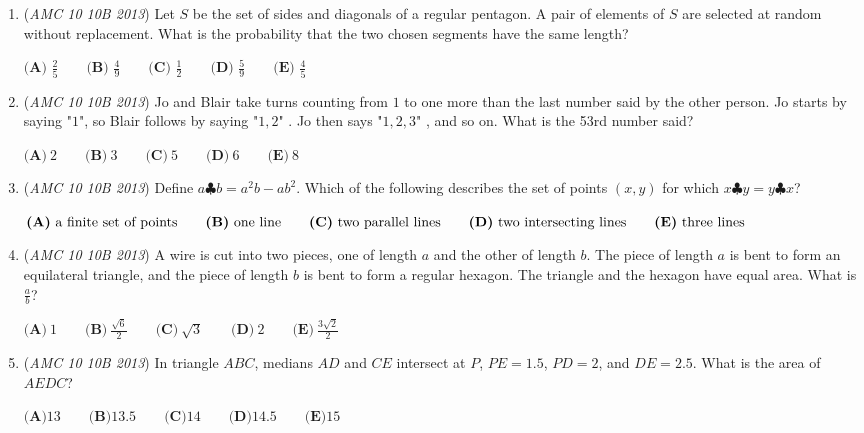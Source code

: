 \begin{enumerate}
	\item (\textit{AMC 10 10B 2013}) Let $S$ be the set of sides and diagonals of a regular pentagon. A pair of elements of $S$ are selected at random without replacement. What is the probability that the two chosen segments have the same length?


 $\textbf{(A) }\frac{2}5\qquad\textbf{(B) }\frac{4}9\qquad\textbf{(C) }\frac{1}2\qquad\textbf{(D) }\frac{5}9\qquad\textbf{(E) }\frac{4}5$


	\item (\textit{AMC 10 10B 2013}) Jo and Blair take turns counting from $1$ to one more than the last number said by the other person. Jo starts by saying "$1$", so Blair follows by saying "$1, 2$" . Jo then says "$1, 2, 3$" , and so on. What is the 53rd number said?


 $\textbf{(A)}\ 2\qquad\textbf{(B)}\ 3\qquad\textbf{(C)}\ 5\qquad\textbf{(D)}\ 6\qquad\textbf{(E)}\ 8$


	\item (\textit{AMC 10 10B 2013}) Define $a\clubsuit b=a^2b-ab^2$. Which of the following describes the set of points $(x, y)$ for which $x\clubsuit y=y\clubsuit x$?


 $\textbf{(A)}\ \text{a finite set of points}\\ \qquad\textbf{(B)}\ \text{one line}\\ \qquad\textbf{(C)}\ \text{two parallel lines}\\ \qquad\textbf{(D)}\ \text{two intersecting lines}\\ \qquad\textbf{(E)}\ \text{three lines}$


	\item (\textit{AMC 10 10B 2013}) A wire is cut into two pieces, one of length $a$ and the other of length $b$. The piece of length $a$ is bent to form an equilateral triangle, and the piece of length $b$ is bent to form a regular hexagon. The triangle and the hexagon have equal area. What is $\frac{a}{b}$?


 $\textbf{(A)}\ 1\qquad\textbf{(B)}\ \frac{\sqrt{6}}{2}\qquad\textbf{(C)}\ \sqrt{3} \qquad\textbf{(D)}\ 2\qquad\textbf{(E)}\ \frac{3\sqrt{2}}{2}$


	\item (\textit{AMC 10 10B 2013}) In triangle $ABC$, medians $AD$ and $CE$ intersect at $P$, $PE=1.5$, $PD=2$, and $DE=2.5$.  What is the area of $AEDC$?


 $\textbf{(A)}13\qquad\textbf{(B)}13.5\qquad\textbf{(C)}14\qquad\textbf{(D)}14.5\qquad\textbf{(E)}15\qquad$



\end{enumerate}
